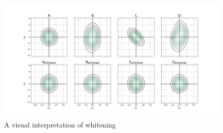 \begin{frame}{\secname}

\begin{figure}[ht]
\label{fig:sphering}
\includegraphics[width=12cm]{img/cov.png}
\caption{A visual interpretation of whitening}
\end{figure}

\end{frame}
